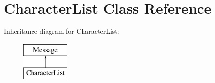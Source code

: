\hypertarget{classCharacterList}{}\section{Character\+List Class Reference}
\label{classCharacterList}
Inheritance diagram for Character\+List\+:\begin{figure}[H]
\begin{center}
\leavevmode
\includegraphics[height=2.000000cm]{classCharacterList}
\end{center}
\end{figure}
